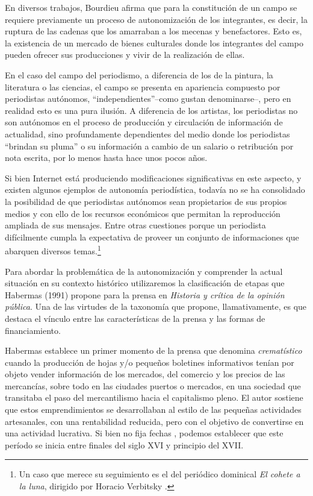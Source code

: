 En diversos trabajos, Bourdieu afirma que para la constitución de un campo se requiere previamente un proceso de autonomización de los integrantes, es decir, la ruptura de las cadenas que los amarraban a los mecenas y benefactores. Esto es, la existencia de un mercado de bienes culturales donde los integrantes del campo pueden ofrecer sus producciones y vivir de la realización de ellas.

En el caso del campo del periodismo, a diferencia de los de la pintura, la literatura o las ciencias, el campo se presenta en apariencia compuesto por periodistas autónomos, ``independientes''--como gustan denominarse--, pero en realidad esto es una pura ilusión. A diferencia de los artistas, los periodistas no son autónomos en el proceso de producción y circulación de información de actualidad, sino profundamente dependientes del medio donde los periodistas ``brindan su pluma'' o su información a cambio de un salario o retribución por nota escrita, por lo menos hasta hace unos pocos años.

Si bien Internet está produciendo modificaciones significativas en este aspecto, y existen algunos ejemplos de autonomía periodística, todavía no se ha consolidado la posibilidad de que periodistas autónomos sean propietarios de sus propios medios y con ello de los recursos económicos que permitan la reproducción ampliada de sus mensajes. Entre otras cuestiones porque un periodista difícilmente cumpla la expectativa de proveer un conjunto de informaciones que abarquen diversos temas.\footnote{Un caso que merece su seguimiento es el del periódico dominical \emph{El cohete a la luna}, dirigido por Horacio Verbitsky .}

Para abordar la problemática de la autonomización y comprender la actual situación en su contexto histórico utilizaremos la clasificación de etapas que Habermas (1991) propone para la prensa en \emph{Historia y crítica de la opinión pública}. Una de las virtudes de la taxonomía que propone, llamativamente, es que destaca el vínculo entre las características de la prensa y las formas de financiamiento.

Habermas establece un primer momento de la prensa que denomina \emph{crematístico} cuando la producción de hojas y/o pequeños boletines informativos tenían por objeto vender información de los mercados, del comercio y los precios de las mercancías, sobre todo en las ciudades puertos o mercados, en una sociedad que transitaba el paso del mercantilismo hacia el capitalismo pleno. El autor sostiene que estos emprendimientos se desarrollaban al estilo de las pequeñas actividades artesanales, con una rentabilidad reducida, pero con el objetivo de convertirse en una actividad lucrativa. Si bien no fija fechas , podemos establecer que este período se inicia entre finales del siglo XVI y principio del XVII.

